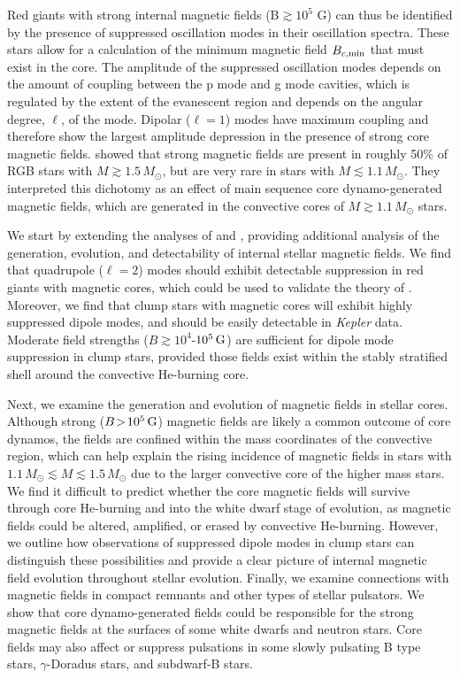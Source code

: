 Red giants with strong internal magnetic fields (B$\gtrsim 10^5$ G) can thus be identified by the presence of suppressed oscillation modes in their oscillation spectra. These stars allow for a calculation of the minimum magnetic field $B_{c,{\rm min}}$ that must exist in the core. The amplitude of the suppressed oscillation modes depends on the amount of coupling between the p mode and g mode cavities, which is regulated by the extent of the evanescent region and depends on the angular degree, $\ell$, of the mode. Dipolar ($\ell=1$) modes have maximum coupling and therefore show the largest amplitude depression in the presence of strong core magnetic fields. \cite{Stello_2016} showed that strong magnetic fields are present in roughly 50\% of RGB stars with $M \gtrsim 1.5 \, M_\odot$, but are very rare in stars with $M \lesssim 1.1 \, M_\odot$. They interpreted this dichotomy as an effect of main sequence core dynamo-generated magnetic fields, which are generated in the convective cores of $M \gtrsim 1.1 \, M_\odot$ stars.

We start by extending the analyses of \cite{Fuller_2015} and \cite{Stello_2016}, providing additional analysis of the generation, evolution, and detectability of internal stellar magnetic fields. We find that quadrupole ($\ell=2$) modes should exhibit detectable suppression in red giants with magnetic cores, which could be used to validate the theory of \cite{Fuller_2015}. Moreover, we find that clump stars with magnetic cores will exhibit highly suppressed dipole modes, and should be easily detectable in {\it Kepler} data. Moderate field strengths ($B \gtrsim 10^4$-$10^5 \, {\rm G}$) are sufficient for dipole mode suppression in clump stars, provided those fields exist within the stably stratified shell around the convective He-burning core.

Next, we examine the generation and evolution of magnetic fields in stellar cores. Although strong ($B \! > \! 10^5 \, {\rm G}$) magnetic fields are likely a common outcome of core dynamos, the fields are confined within the mass coordinates of the convective region, which can help explain the rising incidence of magnetic fields in stars with $1.1 \, M_\odot \! \lesssim \! M \! \lesssim \! 1.5 \, M_\odot$ due to the larger convective core of the higher mass stars. We find it difficult to predict whether the core magnetic fields will survive through core He-burning and into the white dwarf stage of evolution, as magnetic fields could be altered, amplified, or erased by convective He-burning. However, we outline how observations of suppressed dipole modes in clump stars can distinguish these possibilities and provide a clear picture of internal magnetic field evolution throughout stellar evolution. Finally, we examine connections with magnetic fields in compact remnants and other types of stellar pulsators. We show that core dynamo-generated fields could be responsible for the strong magnetic fields at the surfaces of some white dwarfs and neutron stars. Core fields may also affect or suppress pulsations in some slowly pulsating B type stars, $\gamma$-Doradus stars, and subdwarf-B stars. 

